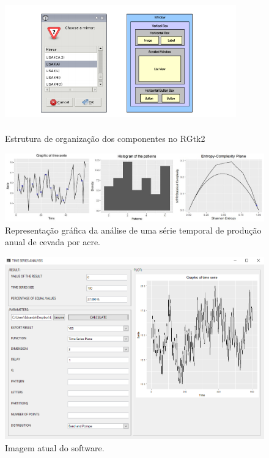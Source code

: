 \begin{figure}
  \centering
  \caption{Estrutura de organização dos componentes no RGtk2}
   \includegraphics[width=10cm,height=6cm]{imagens/rgtk2.png}
\end{figure}
  
\begin{figure}[H]
	\centering
	\includegraphics[width=1\columnwidth]{imagens/rplot}        
    \caption{Representação gráfica da análise de uma série temporal de produção anual de cevada por acre.}
\end{figure}
 
\begin{figure}[H]
	\centering
	\includegraphics[width=0.95\columnwidth]{imagens/tms}   
    \caption{Imagem atual do software.}
    \vspace{6cm}
\end{figure}


